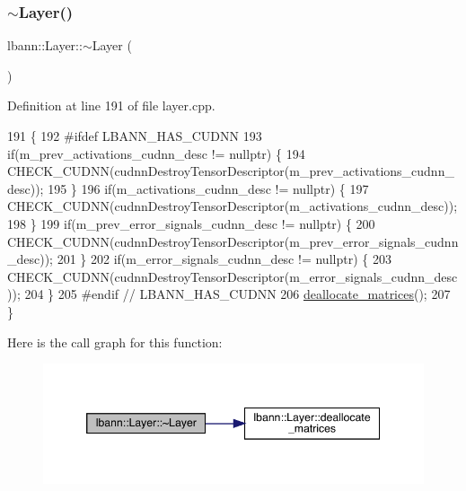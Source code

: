 \subsubsection{\texorpdfstring{$\sim$\+Layer()}{~Layer()}}
{\footnotesize\ttfamily lbann\+::\+Layer\+::$\sim$\+Layer (\begin{DoxyParamCaption}{ }\end{DoxyParamCaption})\hspace{0.3cm}{\ttfamily [virtual]}}



Definition at line 191 of file layer.\+cpp.


\begin{DoxyCode}
191               \{
192 \textcolor{preprocessor}{#ifdef LBANN\_HAS\_CUDNN}
193   \textcolor{keywordflow}{if}(m\_prev\_activations\_cudnn\_desc != \textcolor{keyword}{nullptr}) \{
194     CHECK\_CUDNN(cudnnDestroyTensorDescriptor(m\_prev\_activations\_cudnn\_desc));
195   \}
196   \textcolor{keywordflow}{if}(m\_activations\_cudnn\_desc != \textcolor{keyword}{nullptr}) \{
197     CHECK\_CUDNN(cudnnDestroyTensorDescriptor(m\_activations\_cudnn\_desc));
198   \}
199   \textcolor{keywordflow}{if}(m\_prev\_error\_signals\_cudnn\_desc != \textcolor{keyword}{nullptr}) \{
200     CHECK\_CUDNN(cudnnDestroyTensorDescriptor(m\_prev\_error\_signals\_cudnn\_desc));
201   \}
202   \textcolor{keywordflow}{if}(m\_error\_signals\_cudnn\_desc != \textcolor{keyword}{nullptr}) \{
203     CHECK\_CUDNN(cudnnDestroyTensorDescriptor(m\_error\_signals\_cudnn\_desc));
204   \}
205 \textcolor{preprocessor}{#endif // LBANN\_HAS\_CUDNN}
206   \hyperlink{classlbann_1_1Layer_a888392d6ac6906093a8125c6a37de075}{deallocate\_matrices}();
207 \}
\end{DoxyCode}
Here is the call graph for this function\+:\nopagebreak
\begin{figure}[H]
\begin{center}
\leavevmode
\includegraphics[width=346pt]{classlbann_1_1Layer_a68c3f57587956da938406812f13ecb78_cgraph}
\end{center}
\end{figure}


